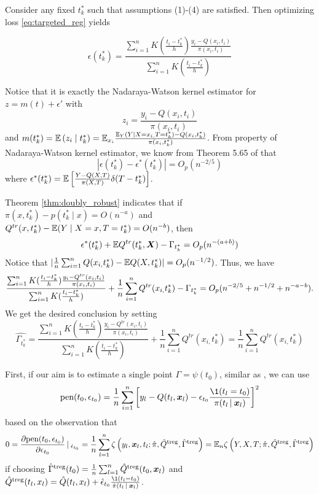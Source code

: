 \iffalse
Consider any fixed $t_k^*$ such that assumptions (1)-(4) are satisfied. Then optimizing loss \eqref{eq:targeted_reg} yields

\[
\epsilon(t_{k}^{*})=\frac{\sum_{i=1}^{n}K(\frac{t_{i}-t_{k}^{*}}{h})\frac{y_{i}-Q(x_{i},t_{i})}{\pi(x_{i},t_{i})}}{\sum_{i=1}^{n}K(\frac{t_{i}-t_{k}^{*}}{h})}
\]

Notice that it is exactly the Nadaraya-Watson kernel estimator for $z=m(t)+\epsilon'$ with
\[
z_{i}=\frac{y_{i}-Q(x_{i},t_{i})}{\pi(x_{i},t_{i})}
\]
 and $m(t_{k}^{*})=\mathbb{E}\left(z_{i}\mid t_{k}^{*}\right)=\mathbb{E}_{x_{i}}\frac{\mathbb{E}_{Y}\left(Y\mid X=x_{i,}T=t_{k}^{*}\right)-Q(x_{i},t_{k}^{*})}{\pi(x_{i},t_{k}^{*})}$.
From property of Nadaraya-Watson kernel estimator, we know from Theorem 5.65 of \cite{wasserman2006all} that 
\[
|\epsilon(t_k^*)-\epsilon^{*}(t_k^*)|=O_p(n^{-2/5})
\]
where $\epsilon^{*}(t_k^*)=\mathbb{E}\left[\frac{Y-Q(X,T)}{\pi(X,T)}\delta(T-t_k^*)\right]$.

Theorem \ref{thm:doubly_robust} indicates that
if $\pi(x,t_k^*)-p(t_k^*\mid x)=O(n^{-a})$ and $Q^{tr}(x,t_k^*)-\mathbb{E}(Y\mid X=x,T=t_k^*)=O(n^{-b})$, then
$$
\epsilon^*(t_k^*)+\mathbb{E} Q^{tr}(t_k^*,\boldsymbol{X})-\Gamma_{t_k^*}=O_p(n^{-(a+b)})
$$
Notice that $|\frac{1}{n}\sum_{i=1}^{n}Q(x_{i,}t_{k}^{*})-\mathbb{E} Q(X,t_{k}^{*})|=O_p(n^{-1/2})$. Thus, we have 
\[
\frac{\sum_{i=1}^{n}K(\frac{t_{i}-t_{k}^{*}}{h})\frac{y_{i}-Q^{tr}(x_{i},t_{i})}{\pi(x_{i},t_{i})}}{\sum_{i=1}^{n}K(\frac{t_{i}-t_{k}^{*}}{h})}+\frac{1}{n}\sum_{i=1}^{n}Q^{tr}(x_{i,}t_{k}^{*})-\Gamma_{t_{k}^{*}}=O_{p}(n^{-2/5}+n^{-1/2}+n^{-a-b}).
\]
We get the desired conclusion by setting
$$
\widehat{\Gamma_{t_{k}^{*}}}
=
\frac{\sum_{i=1}^{n}K(\frac{t_{i}-t_{k}^{*}}{h})\frac{y_{i}-Q^{tr}(x_{i},t_{i})}{\pi(x_{i},t_{i})}}{\sum_{i=1}^{n}K(\frac{t_{i}-t_{k}^{*}}{h})}+\frac{1}{n}\sum_{i=1}^{n}Q^{tr}(x_{i,}t_{k}^{*})
=\frac{1}{n}\sum_{i=1}^{n}Q^{tr}(x_{i,}t_{k}^{*})
$$





First, if our aim is to estimate a single point $\Gamma=\psi(t_0)$, similar as \cite{shi2019adapting}, we can use
\begin{equation*}
    \text{pen}(t_0,\epsilon_{t_0})=\frac{1}{n}\sum_{i=1}^n\left[y_l-Q(t_l,\x_l)-\epsilon_{t_0}\frac{\1(t_l=t_0)}{\pi(t_l\C\x_l)}\right]^2
\end{equation*}
based on the observation that
\begin{equation}\label{eq:TMLE_derivative}
    \begin{split}
        0=\frac{\partial \text{pen}(t_0,\epsilon_{t_0})}{\partial \epsilon_{t_0}}\,|\:_{\hat\epsilon_{t_0}}
        =\frac{1}{n}\sum_{l=1}^n\zeta\left(y_l,\boldsymbol{x}_l,t_l;\hat \pi,\hat Q^{\text{treg}},\hat\Gamma^{\text{treg}}\right)
        =\mathbb{E}_n \zeta\left(Y,X,T;\hat\pi,\hat Q^{\text{treg}},\hat\Gamma^{\text{treg}}\right)
    \end{split}
\end{equation}
if choosing $\hat\Gamma^{\text{treg}}(t_0)=\frac{1}{n}\sum_{l=1}^n\hat Q^{\text{treg}}(t_0,\boldsymbol{x}_l)$ and $\hat Q^{\text{treg}}(t_l,x_l)=\hat Q(t_l,x_l)+\hat\epsilon_{t_0}\frac{\1(t_l=t_0)}{\hat\pi(t_l\C\x_l)}$.

